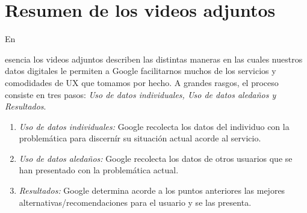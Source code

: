 \documentclass[stu, 12pt, letterpaper, donotrepeattitle, floatsintext, natbib]{apa7}
\begin{document}
\section*{Resumen de los videos adjuntos}
En \begin{justifying}
    esencia los videos adjuntos describen las distintas maneras en las cuales nuestros datos digitales le permiten a Google facilitarnos
    muchos de los servicios y comodidades de UX que tomamos por hecho. A grandes rasgos, el proceso consiste en tres pasos:
    \emph{Uso de datos individuales, Uso de datos aledaños y Resultados}.\par
\end{justifying}
\begin{justifying}
    \begin{enumerate}
        \item \emph{Uso de datos individuales:} Google recolecta los datos del individuo con la problemática para discernír su situación actual acorde al servicio.
        \item \emph{Uso de datos aledaños:} Google recolecta los datos de otros usuarios que se han presentado con la problemática actual.
        \item \emph{Resultados:} Google determina acorde a los puntos anteriores las mejores alternativas/recomendaciones para el usuario y se las presenta.
    \end{enumerate}
\end{justifying}

\renewcommand\refname{\textbf{Referencias}}
\end{document}
